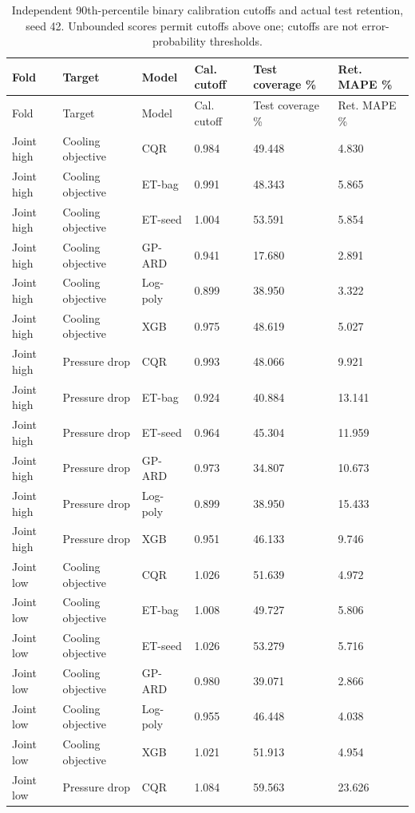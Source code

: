 \begingroup\small\setlength{\tabcolsep}{3pt}\begin{longtable}{llllll}
\caption{Independent 90th-percentile binary calibration cutoffs and actual test retention, seed 42. Unbounded scores permit cutoffs above one; cutoffs are not error-probability thresholds.}\label{tab:ubend-actual_thresholds}\\\toprule
Fold & Target & Model & Cal. cutoff & Test coverage \% & Ret. MAPE \%\\\midrule
\endfirsthead\toprule
Fold & Target & Model & Cal. cutoff & Test coverage \% & Ret. MAPE \%\\\midrule
\endhead
Joint high & Cooling objective & CQR & 0.984 & 49.448 & 4.830\\
Joint high & Cooling objective & ET-bag & 0.991 & 48.343 & 5.865\\
Joint high & Cooling objective & ET-seed & 1.004 & 53.591 & 5.854\\
Joint high & Cooling objective & GP-ARD & 0.941 & 17.680 & 2.891\\
Joint high & Cooling objective & Log-poly & 0.899 & 38.950 & 3.322\\
Joint high & Cooling objective & XGB & 0.975 & 48.619 & 5.027\\
Joint high & Pressure drop & CQR & 0.993 & 48.066 & 9.921\\
Joint high & Pressure drop & ET-bag & 0.924 & 40.884 & 13.141\\
Joint high & Pressure drop & ET-seed & 0.964 & 45.304 & 11.959\\
Joint high & Pressure drop & GP-ARD & 0.973 & 34.807 & 10.673\\
Joint high & Pressure drop & Log-poly & 0.899 & 38.950 & 15.433\\
Joint high & Pressure drop & XGB & 0.951 & 46.133 & 9.746\\
Joint low & Cooling objective & CQR & 1.026 & 51.639 & 4.972\\
Joint low & Cooling objective & ET-bag & 1.008 & 49.727 & 5.806\\
Joint low & Cooling objective & ET-seed & 1.026 & 53.279 & 5.716\\
Joint low & Cooling objective & GP-ARD & 0.980 & 39.071 & 2.866\\
Joint low & Cooling objective & Log-poly & 0.955 & 46.448 & 4.038\\
Joint low & Cooling objective & XGB & 1.021 & 51.913 & 4.954\\
Joint low & Pressure drop & CQR & 1.084 & 59.563 & 23.626\\

\end{longtable}
